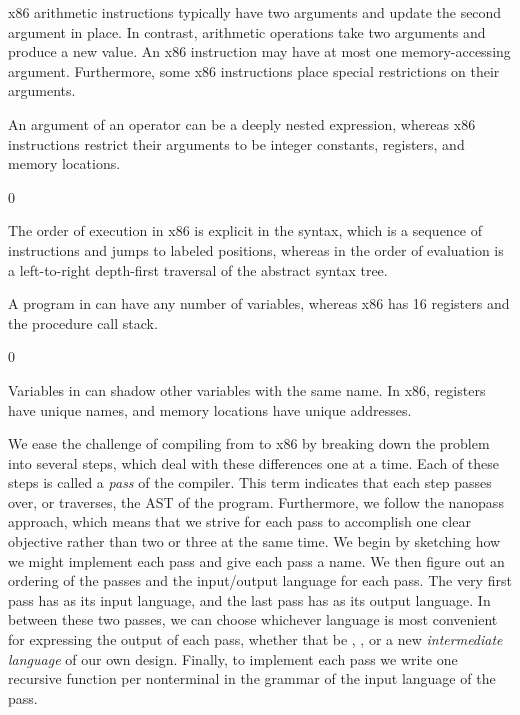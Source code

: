 \documentclass[7x10]{TimesAPriori_MIT}%
\def\racketEd{0}
\def\edition{1}
\numberwithin{theorem}{chapter}
\numberwithin{definition}{chapter}
\numberwithin{equation}{chapter}
\begin{document}
\begin{enumerate}
\item x86 arithmetic instructions typically have two arguments and
  update the second argument in place. In contrast, \LangVar{}
  arithmetic operations take two arguments and produce a new value.
  An x86 instruction may have at most one memory-accessing argument.
  Furthermore, some x86 instructions place special restrictions on
  their arguments.

\item An argument of an \LangVar{} operator can be a deeply nested
  expression, whereas x86 instructions restrict their arguments to be
  integer constants, registers, and memory locations.

{\if\edition\racketEd      
\item The order of execution in x86 is explicit in the syntax, which
  is a sequence of instructions and jumps to labeled positions,
  whereas in \LangVar{} the order of evaluation is a left-to-right
  depth-first traversal of the abstract syntax tree.  \fi}

\item A program in \LangVar{} can have any number of variables,
  whereas x86 has 16 registers and the procedure call stack.
{\if\edition\racketEd    
\item Variables in \LangVar{} can shadow other variables with the
  same name. In x86, registers have unique names, and memory locations
  have unique addresses.
\fi}  
\end{enumerate}

We ease the challenge of compiling from \LangVar{} to x86 by breaking
down the problem into several steps, which deal with these differences
one at a time. Each of these steps is called a \emph{pass} of the
compiler.
%
This term indicates that each step passes over, or traverses, the AST
of the program.
%
Furthermore, we follow the nanopass approach, which means that we
strive for each pass to accomplish one clear objective rather than two
or three at the same time.
%
We begin by sketching how we might implement each pass and give each
pass a name.  We then figure out an ordering of the passes and the
input/output language for each pass. The very first pass has
\LangVar{} as its input language, and the last pass has \LangXInt{} as
its output language. In between these two passes, we can choose
whichever language is most convenient for expressing the output of
each pass, whether that be \LangVar{}, \LangXInt{}, or a new
\emph{intermediate language} of our own design.  Finally, to
implement each pass we write one recursive function per nonterminal in
the grammar of the input language of the pass.
\end{document}
